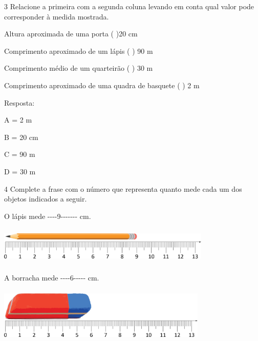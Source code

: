 \begin{escolha}
\begin{escolha}
\end{escolha}

\num{3} Relacione a primeira com a segunda coluna levando em conta qual valor
pode corresponder à medida mostrada.

\begin{escolha}

\item
  Altura aproximada de uma porta ( )20 cm
\item
  Comprimento aproximado de um lápis ( ) 90 m
\item
  Comprimento médio de um quarteirão ( ) 30 m
\item
  Comprimento aproximado de uma quadra de basquete ( ) 2 m

\end{escolha}

Resposta:

A = 2 m

B = 20 cm

C = 90 m

D = 30 m

\num{4} Complete a frase com o número que representa quanto mede cada um dos
objetos indicados a seguir.

\begin{escolha}

\item
  O lápis mede -\/-\/-\/-9-\/-\/-\/-\/-\/-\/- cm.

  \includegraphics[width=4.00868in,height=0.70839in]{media/image42.png}



\item
  A borracha mede -\/-\/-\/-6-\/-\/-\/-\/- cm.

  \includegraphics[width=3.93367in,height=1.02509in]{media/image43.png}



\end{escolha}
\end{escolha}
